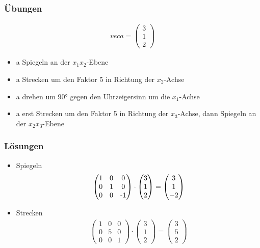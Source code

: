 \begin{frame}
	\frametitle{Übungen}
	\begin{gather*}
	vec{a} = \begin{pmatrix}
	    3 \\
	    1 \\
	    2
	\end{pmatrix}
	\end{gather*}
	\begin{itemize}
		\item a Spiegeln an der $x_{1}x_{2}$-Ebene
		\item a Strecken um den Faktor 5 in Richtung der $x_{2}$-Achse
		\item a drehen um 90° gegen den Uhrzeigersinn um die $x_{1}$-Achse
		\item a erst Strecken um den Faktor 5 in Richtung der $x_{3}$-Achse, dann Spiegeln an der $x_{2}x_{3}$-Ebene
	\end{itemize}
\end{frame}

\begin{frame}
	\frametitle{Lösungen}
	\begin{itemize}
		\item Spiegeln
		\begin{gather*}
		\begin{pmatrix}
			1 & 0 & 0 \\
			0 & 1 & 0 \\
			0 & 0 & $-1$
			\end{pmatrix} \cdot
			\begin{pmatrix}
				3 \\
				1 \\
				2
			\end{pmatrix} = \begin{pmatrix}
				3 \\
				1 \\
				-2
			\end{pmatrix} \end{gather*}
		\item Strecken
		\begin{gather*} \begin{pmatrix}
			1 & 0 & 0 \\
			0 & 5 & 0 \\
			0 & 0 & 1
			\end{pmatrix} \cdot
			\begin{pmatrix}
				3 \\
				1 \\
				2
			\end{pmatrix} = \begin{pmatrix}
				3 \\
				5 \\
				2
			\end{pmatrix} \end{gather*}
	\end{itemize}
\end{frame}

